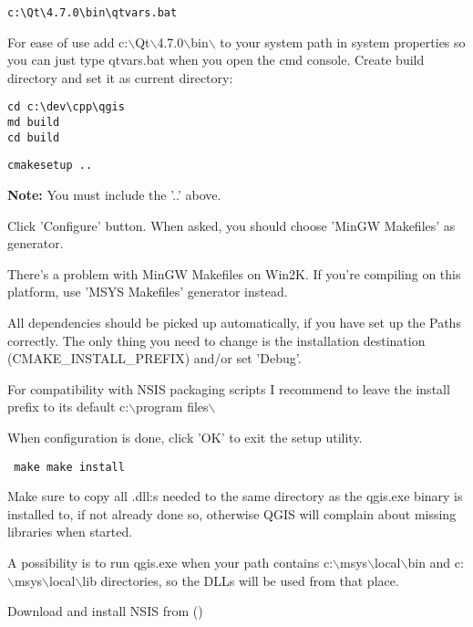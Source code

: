 \begin{verbatim}
c:\Qt\4.7.0\bin\qtvars.bat 
\end{verbatim}

For ease of use add c:$\backslash$Qt$\backslash$4.7.0$\backslash$bin$\backslash$ to your system path in system
properties so you can just type qtvars.bat when you open the cmd console.
Create build directory and set it as current directory:

\begin{verbatim}
cd c:\dev\cpp\qgis 
md build 
cd build 
\end{verbatim}

\begin{verbatim}
cmakesetup ..  
\end{verbatim}

\textbf{Note:} You must include the '..' above.

Click 'Configure' button.  When asked, you should choose 'MinGW Makefiles' as
generator.

There's a problem with MinGW Makefiles on Win2K. If you're compiling on this
platform, use 'MSYS Makefiles' generator instead.

All dependencies should be picked up automatically, if you have set up the
Paths correctly. The only thing you need to change is the installation
destination (CMAKE\_INSTALL\_PREFIX) and/or set 'Debug'.

For compatibility with NSIS packaging scripts I recommend to leave the install
prefix to its default c:$\backslash$program files$\backslash$

When configuration is done, click 'OK' to exit the setup utility.

\begin{verbatim}
 make make install 
\end{verbatim}

Make sure to copy all .dll:s needed to the same directory as the qgis.exe
binary is installed to, if not already done so, otherwise QGIS will complain
about missing libraries when started.

A possibility is to run qgis.exe when your path contains c:$\backslash$msys$\backslash$local$\backslash$bin and
c:$\backslash$msys$\backslash$local$\backslash$lib directories, so the DLLs will be used from that place.

Download and install NSIS from ()

